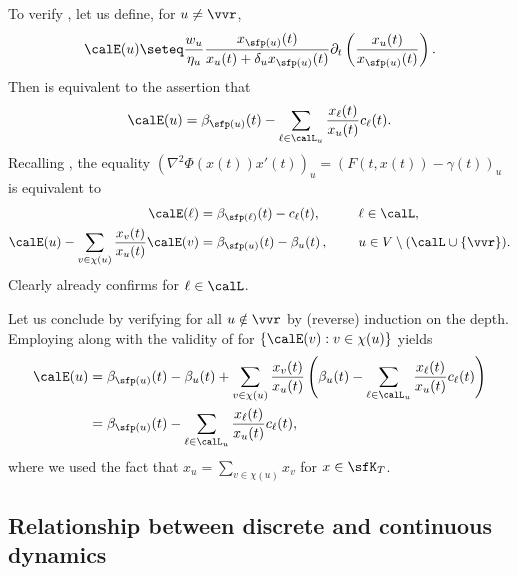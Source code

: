 To verify , let us define, for $u \neq \vvr$,
\[
\calE(u) \seteq
\frac{w_u}{\eta_u} \frac{x_{\sfp(u)}(t)}{x_u(t)+\delta_u x_{\sfp(u)}(t)} \partial_t \left(\frac{x_u(t)}{x_{\sfp(u)}(t)}\right).
\]
Then  is equivalent to the assertion that
\begin{equation}\label{eq:ass1}
\calE(u) = \beta_{\sfp(u)}(t) - \sum_{\ell \in \calL_u} \frac{x_{\ell}(t)}{x_u(t)} c_{\ell}(t).
\end{equation}
Recalling ,
the equality $\left(\nabla^2 \Phi(x(t)) x'(t)\right)_u = \left(F(t,x(t))-\gamma(t)\right)_u$ is equivalent to
\begin{alignat}{3}
\calE(\ell) &= \beta_{\sfp(\ell)}(t) - c_{\ell}(t), \qquad && \ell \in \calL, \label{eq:eleaves} \\
\calE(u) - \sum_{v \in \chi(u)} \frac{x_v(t)}{x_u(t)} \calE(v) &= \beta_{\sfp(u)}(t) - \beta_u(t)\,, && u \in V \setminus (\calL \cup \{\vvr\}). \label{eq:egen}
\end{alignat}
Clearly  already confirms  for $\ell \in \calL$.


Let us conclude by verifying  for all $u \notin \vvr$  by (reverse) induction on the depth.
Employing  along with the validity of  for $\{\calE(v) : v \in \chi(u)\}$ yields
\begin{align*}
\calE(u) &= \beta_{\sfp(u)}(t) - \beta_u(t) + \sum_{v \in \chi(u)} \frac{x_v(t)}{x_u(t)} \left(\beta_u(t) - \sum_{\ell \in \calL_u} \frac{x_{\ell}(t)}{x_u(t)} c_{\ell}(t)\right) \\
&= \beta_{\sfp(u)}(t) - \sum_{\ell \in \calL_u} \frac{x_{\ell}(t)}{x_{u}(t)} c_{\ell}(t),
\end{align*}
where we used the fact that $x_u = \sum_{v \in \chi(u)} x_v$ for $x \in \sfK_{T}$.

\subsection{Relationship between discrete and continuous dynamics}
\label{sec:continuous}

